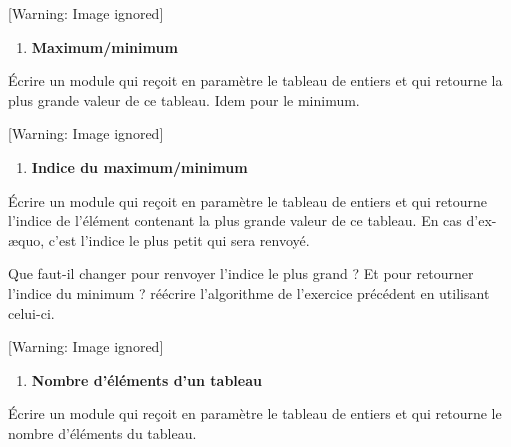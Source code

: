 \begin{center}
 [Warning: Image ignored] %

\end{center}
\liststyleExercice
\setcounter{saveenum}{\value{enumi}}
\begin{enumerate}
\setcounter{enumi}{\value{saveenum}}
\item {\sffamily\bfseries
Maximum/minimum}
\end{enumerate}
{
Écrire un module qui reçoit en paramètre le tableau
 de  entiers et qui
retourne la plus grande valeur de ce tableau. Idem pour le minimum.}

\begin{center}
 [Warning: Image ignored] %

\end{center}
\liststyleExercice
\setcounter{saveenum}{\value{enumi}}
\begin{enumerate}
\setcounter{enumi}{\value{saveenum}}
\item {\sffamily\bfseries
Indice du maximum/minimum}
\end{enumerate}
{
Écrire un module qui reçoit en paramètre le tableau
 de  entiers et qui
retourne l’indice de l’élément contenant la plus grande valeur de ce
tableau. 
En cas d’ex-æquo, c’est l’indice le plus petit qui sera renvoyé.

Que faut-il changer pour renvoyer l’indice le plus grand ?
Et pour retourner l’indice du minimum ? 
réécrire l’algorithme de l’exercice précédent en utilisant celui-ci.}

\begin{center}
 [Warning: Image ignored] %

\end{center}
\liststyleExercice
\setcounter{saveenum}{\value{enumi}}
\begin{enumerate}
\setcounter{enumi}{\value{saveenum}}
\item {\sffamily\bfseries
Nombre d'éléments d'un tableau}
\end{enumerate}
{
Écrire un module qui reçoit en paramètre le tableau
 de  entiers et qui
retourne le nombre d’éléments du tableau. }

